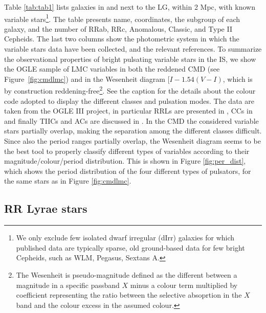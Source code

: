 \documentclass{mem}
\begin{document}
Table \ref{tab:tab1} lists galaxies in and next to the LG, within 2 Mpc, with known variable stars\footnote{We only exclude few isolated dwarf irregular (dIrr) galaxies for which published data are typically sparse, old ground-based data for few bright Cepheids, such as WLM, Pegasus, Sextans A.}. The table presents name, coordinates, the subgroup of each galaxy, and the number of RRab, RRc, Anomalous, Classic, and Type II Cepheids. The last two columns show the photometric system in which the variable stars data have been collected, and the relevant references.
To summarize the observational properties of bright pulsating variable stars in the IS, we show the OGLE sample of LMC variables in both the reddened CMD (see Figure~\ref{fig:cmdlmc}) and in the Wesenheit diagram [$I-1.54(V-I)$, which is by construction reddening-free\footnote{The Wesenheit is pseudo-magnitude defined as the different between a magnitude in a specific passband $X$ minus a colour term multiplied by coefficient representing the ratio between the selective absoprtion in the $X$ band and the colour excess in the assumed colour.}. See the caption for the details about the colour code adopted to display the different classes and pulsation modes. The data are taken from the OGLE III project, in particular RRLs are presented in \citet{soszynski09a}, CCs in \citet{soszynski08b} and finally TIICs and ACs are discussed in \citet{soszynski08c}. In the CMD the considered variable stars partially overlap, making the separation among the different classes difficult. Since also the period ranges partially overlap, the Wesenheit diagram seems to be the best tool to properly classify different types of variables according to their magnitude/colour/period distribution. This is shown in Figure \ref{fig:per_dist}, which shows the period distribution of the four different types of pulsators, for the same stars as in Figure \ref{fig:cmdlmc}.

    \subsection{RR Lyrae stars}\label{sec:rr_obs}
\end{document}
